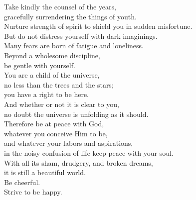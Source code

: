 Take kindly the counsel of the years,\\
gracefully surrendering the things of youth.\\
Nurture strength of spirit to shield you in sudden misfortune.\\
But do not distress yourself with dark imaginings.\\
Many fears are born of fatigue and loneliness.\\
Beyond a wholesome discipline,\\
be gentle with yourself.\\

You are a child of the universe,\\
no less than the trees and the stars;\\
you have a right to be here.\\
And whether or not it is clear to you,\\
no doubt the universe is unfolding as it should.\\

Therefore be at peace with God,\\
whatever you conceive Him to be,\\
and whatever your labors and aspirations,\\
in the noisy confusion of life keep peace with your soul.\\

With all its sham, drudgery, and broken dreams,\\
it is still a beautiful world.\\
Be cheerful.\\
Strive to be happy.